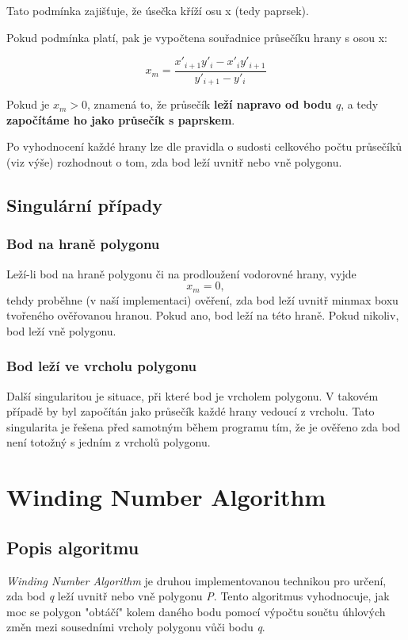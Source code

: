\documentclass[a4paper,12pt]{article}
\begin{document}
Tato podmínka zajišťuje, že úsečka kříží osu x (tedy paprsek).

Pokud podmínka platí, pak je vypočtena souřadnice průsečíku hrany s osou x:

\[
x_m = \frac{x'_{i+1} y'_i - x'_i y'_{i+1}}{y'_{i+1} - y'_i}
\]

Pokud je \( x_m > 0 \), znamená to, že průsečík \textbf{leží napravo od bodu \( q \)}, a tedy \textbf{započítáme ho jako průsečík s paprskem}.

Po vyhodnocení každé hrany lze dle pravidla o sudosti celkového počtu průsečíků (viz výše) rozhodnout o tom, zda bod leží uvnitř nebo vně polygonu.



\subsection{Singulární případy}
\subsubsection{Bod na hraně polygonu}
Leží-li bod na hraně polygonu či na prodloužení vodorovné hrany, vyjde \[
x_m = 0,
\]
tehdy proběhne (v naší implementaci) ověření, zda bod leží uvnitř minmax boxu tvořeného ověřovanou hranou. Pokud ano, bod leží na této hraně. Pokud nikoliv, bod leží vně polygonu.

\subsubsection{Bod leží ve vrcholu polygonu}
Další singularitou je situace, při které bod je vrcholem polygonu. V takovém případě by byl započítán jako průsečík každé hrany vedoucí z vrcholu. Tato singularita je řešena před samotným během programu tím, že je ověřeno zda bod není totožný s jedním z vrcholů polygonu.




\section{Winding Number Algorithm}
\subsection{Popis algoritmu}
\textit{Winding Number Algorithm} je druhou implementovanou technikou pro určení, zda bod \textit{q}  leží uvnitř nebo vně polygonu \textit{P}. Tento algoritmus vyhodnocuje, jak moc se polygon "obtáčí" kolem daného bodu pomocí výpočtu součtu úhlových změn mezi sousedními vrcholy polygonu vůči bodu \textit{q}. 
\end{document}
